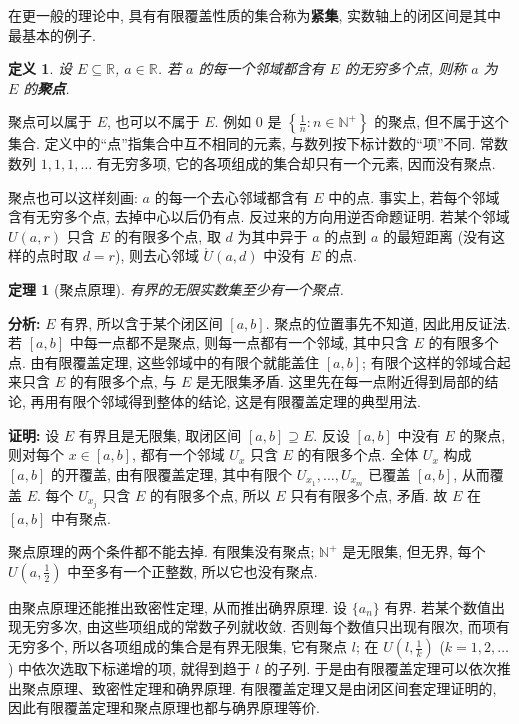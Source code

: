 \documentclass[UTF8,openany]{ctexbook}
\theoremstyle{chinesetextbook}
\newtheorem{definition}{定义}[section]
\newtheorem{theorem}{定理}[section]
\newenvironment{cnproof}{\par\indent\textbf{证明:} \ignorespaces}{\par}
\begin{document}
在更一般的理论中, 具有有限覆盖性质的集合称为\textbf{紧集}, 实数轴上的闭区间是其中最基本的例子.
\begin{definition}
设 $E\subseteq\mathbb R$, $a\in\mathbb R$. 若 $a$ 的每一个邻域都含有 $E$ 的无穷多个点, 则称 $a$ 为 $E$ 的\textbf{聚点}.
\end{definition}
聚点可以属于 $E$, 也可以不属于 $E$. 例如 $0$ 是 $\displaystyle\left\{\frac1n:n\in\mathbb N^+\right\}$ 的聚点, 但不属于这个集合. 定义中的“点”指集合中互不相同的元素, 与数列按下标计数的“项”不同. 常数数列 $1,1,1,\ldots$ 有无穷多项, 它的各项组成的集合却只有一个元素, 因而没有聚点.

聚点也可以这样刻画: $a$ 的每一个去心邻域都含有 $E$ 中的点. 事实上, 若每个邻域含有无穷多个点, 去掉中心以后仍有点. 反过来的方向用逆否命题证明. 若某个邻域 $U(a,r)$ 只含 $E$ 的有限多个点, 取 $d$ 为其中异于 $a$ 的点到 $a$ 的最短距离 (没有这样的点时取 $d=r$), 则去心邻域 $\mathring U(a,d)$ 中没有 $E$ 的点.
\begin{theorem}[聚点原理]
有界的无限实数集至少有一个聚点.
\end{theorem}
\par\indent\textbf{分析:} $E$ 有界, 所以含于某个闭区间 $[a,b]$. 聚点的位置事先不知道, 因此用反证法. 若 $[a,b]$ 中每一点都不是聚点, 则每一点都有一个邻域, 其中只含 $E$ 的有限多个点. 由有限覆盖定理, 这些邻域中的有限个就能盖住 $[a,b]$; 有限个这样的邻域合起来只含 $E$ 的有限多个点, 与 $E$ 是无限集矛盾. 这里先在每一点附近得到局部的结论, 再用有限个邻域得到整体的结论, 这是有限覆盖定理的典型用法.
\begin{cnproof}
设 $E$ 有界且是无限集, 取闭区间 $[a,b]\supseteq E$. 反设 $[a,b]$ 中没有 $E$ 的聚点, 则对每个 $x\in[a,b]$, 都有一个邻域 $U_x$ 只含 $E$ 的有限多个点. 全体 $U_x$ 构成 $[a,b]$ 的开覆盖, 由有限覆盖定理, 其中有限个 $U_{x_1},\ldots,U_{x_m}$ 已覆盖 $[a,b]$, 从而覆盖 $E$. 每个 $U_{x_j}$ 只含 $E$ 的有限多个点, 所以 $E$ 只有有限多个点, 矛盾. 故 $E$ 在 $[a,b]$ 中有聚点.
\end{cnproof}
聚点原理的两个条件都不能去掉. 有限集没有聚点; $\mathbb N^+$ 是无限集, 但无界, 每个 $\displaystyle U\left(a,\frac12\right)$ 中至多有一个正整数, 所以它也没有聚点.

由聚点原理还能推出致密性定理, 从而推出确界原理. 设 $\{a_n\}$ 有界. 若某个数值出现无穷多次, 由这些项组成的常数子列就收敛. 否则每个数值只出现有限次, 而项有无穷多个, 所以各项组成的集合是有界无限集, 它有聚点 $l$; 在 $\displaystyle U\left(l,\frac1k\right)$ ($k=1,2,\ldots$) 中依次选取下标递增的项, 就得到趋于 $l$ 的子列. 于是由有限覆盖定理可以依次推出聚点原理、致密性定理和确界原理. 有限覆盖定理又是由闭区间套定理证明的, 因此有限覆盖定理和聚点原理也都与确界原理等价.
\end{document}
